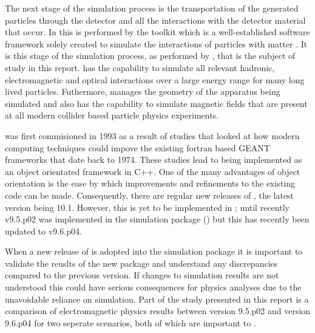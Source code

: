 The next stage of the simulation process is the transportation of the generated particles through the detector and all the interactions with the detector material that occur.  In \lhcb this is performed by the \geant toolkit which is a well-established software framework solely created to simulate the interactions of particles with matter \cite{Agostinelli:2002hh}.  It is this stage of the simulation process, as performed by \geant, that is the subject of study in this report.  \geant has the capability to simulate all relevant hadronic, electromagnetic and optical interactions over a large energy range for many long lived particles. Futhermore, \geant manages the geometry of the apparatus being simulated and also has the capability to simulate magnetic fields that are present at all modern collider based particle physics experiments.

\geant was first commisioned in 1993 as a result of studies that looked at how modern computing techniques could impove the existing fortran based GEANT frameworks that date back to 1974\cite{Agostinelli:2002hh,Brun:118715}.  These studies lead to \geant being implemented as an object orientated framework in C++.  One of the many advantages of object orientation is the ease by which improvements and refinements to the existing code can be made.  Consequently, there are regular new releases of \geant, the latest version being 10.1\cite{g410.1rn}. However, this is yet to be implemented in \lhcb; until recently \geant v9.5.p02 was implemented in the \lhcb simulation package (\gauss) but this has recently been updated to v9.6.p04.

When a new release of \geant is adopted into the \lhcb simulation package it is important to validate the reuslts of the new package and understand any discrepancies compared to the previous version.  If changes to simulation results are not understood this could have serious consequences for physics analyses due to the unavoidable reliance on simulation.  Part of the study presented in this report is a comparison of electromagnetic physics results between \geant version 9.5.p02 and version 9.6.p04 for two seperate scenarios, both of which are important to \lhcb.

